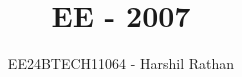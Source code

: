 \documentclass[journal]{IEEEtran}
\begin{document}

\vspace{3cm}

\title{EE - 2007}
\author{EE24BTECH11064 - Harshil Rathan}
 \maketitle
{\let\newpage\relax\maketitle}

\renewcommand{\thefigure}{\theenumi}
\renewcommand{\thetable}{\theenumi}
\setlength{\intextsep}{10pt} %


\renewcommand{\thetable}{\theenumi}
\end{document}
